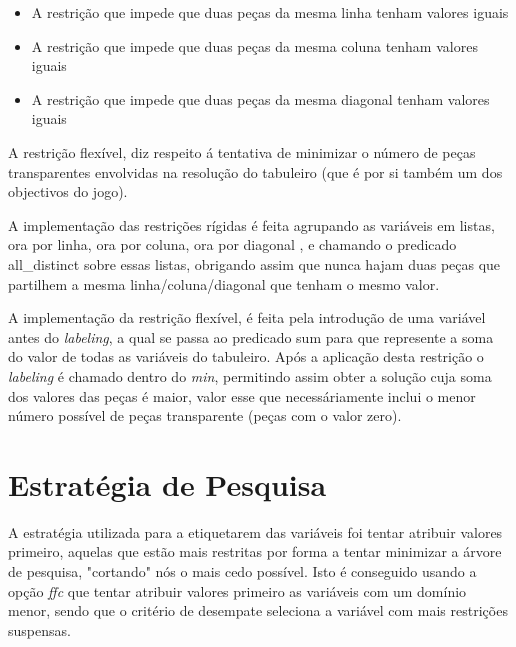 \documentclass{llncs}
\begin{document}
\begin{itemize}
\item A restri\c{c}\~{a}o que impede que duas pe\c{c}as da mesma linha tenham valores iguais
\item A restri\c{c}\~{a}o que impede que duas pe\c{c}as da mesma coluna tenham valores iguais
\item A restri\c{c}\~{a}o que impede que duas pe\c{c}as da mesma diagonal tenham valores iguais
\end{itemize}

A restri\c{c}\~{a}o flex\'{i}vel, diz respeito \'{a} tentativa de minimizar o n\'{u}mero de pe\c{c}as transparentes envolvidas na resolu\c{c}\~{a}o do tabuleiro (que \'{e} por si tamb\'{e}m um dos objectivos do jogo).

A implementa\c{c}\~{a}o das restri\c{c}\~{o}es r\'{i}gidas \'{e} feita agrupando as vari\'{a}veis em listas, ora por linha, ora por coluna, ora por diagonal , e chamando o predicado all\_distinct sobre essas listas, obrigando assim que nunca hajam duas pe\c{c}as que partilhem a mesma linha/coluna/diagonal que tenham o mesmo valor.

A implementa\c{c}\~{a}o da restri\c{c}\~{a}o flex\'{i}vel, \'{e} feita pela introdu\c{c}\~{a}o de uma vari\'{a}vel antes do \emph{labeling}, a qual se passa ao predicado sum para que represente a soma do valor de todas as vari\'{a}veis do tabuleiro. Ap\'{o}s a aplica\c{c}\~{a}o desta restri\c{c}\~{a}o o \emph{labeling} \'{e} chamado dentro do \emph{min}, permitindo assim obter a solu\c{c}\~{a}o cuja soma dos valores das pe\c{c}as \'{e} maior, valor esse que necess\'{a}riamente inclui o menor n\'{u}mero poss\'{i}vel de pe\c{c}as transparente (pe\c{c}as com o valor zero).

\section{Estrat\'{e}gia de Pesquisa}

A estrat\'{e}gia utilizada para a etiquetarem das vari\'{a}veis foi tentar atribuir valores primeiro, aquelas que est\~{a}o mais restritas por forma a tentar minimizar a \'{a}rvore de pesquisa, "cortando" n\'{o}s o mais cedo poss\'{i}vel. Isto \'{e} conseguido usando a op\c{c}\~{a}o \emph{ffc} que tentar atribuir valores primeiro as vari\'{a}veis com um dom\'{i}nio menor, sendo que o crit\'{e}rio de desempate seleciona a vari\'{a}vel com mais restri\c{c}\~{o}es suspensas.
\end{document}
